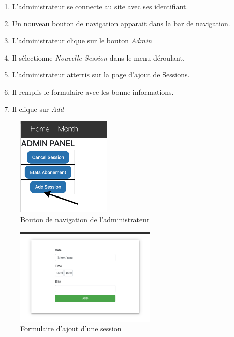 \begin{enumerate}
	\item L'administrateur se connecte au site avec ses identifiant. 
	\item Un nouveau bouton de navigation apparait dans la bar de navigation. 
	\item L'administrateur clique sur le bouton \textit{Admin}
	\item Il sélectionne \textit{Nouvelle Session} dans le menu déroulant. 
	\item L'administrateur atterris sur la page d'ajout de Sessions. 
	\item Il remplis le formulaire avec les bonne informations.
	\item Il clique sur \textit{Add}
\end{enumerate}

\vspace{\baselineskip}
\begin{figure}[h]
	\includegraphics[width=0.4\textwidth,center]{Figures/us10-1}
	\caption{Bouton de navigation de l'administrateur}
\end{figure}

\vspace{\baselineskip}
\begin{figure}[h]
	\includegraphics[width=0.6\textwidth,center]{Figures/us10-2}
	\caption{Formulaire d'ajout d'une session}
\end{figure}

